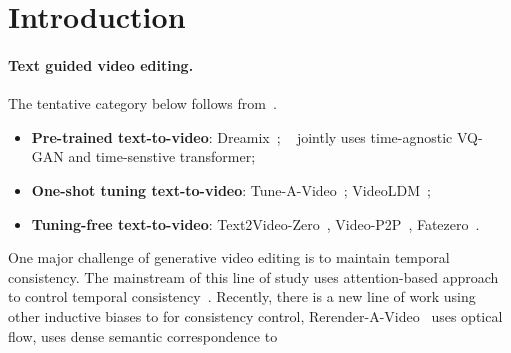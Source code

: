 \section{Introduction}
\paragraph{Text guided video editing.} The tentative category below follows from~\cite{wang2023gen}.
\begin{itemize}
    \item \textbf{Pre-trained text-to-video}: Dreamix~\citep{molad2023dreamix}; ~\cite{ge2022long} jointly uses time-agnostic VQ-GAN and time-senstive transformer; 
    \item \textbf{One-shot tuning text-to-video}: Tune-A-Video~\citep{wu2022tune}; VideoLDM~\citep{blattmann2023align};
    \item \textbf{Tuning-free text-to-video}: Text2Video-Zero~\citep{khachatryan2023text2video}, Video-P2P~\citep{liu2023video}, Fatezero~\citep{qi2023fatezero}.
\end{itemize}


One major challenge of generative video editing is to maintain temporal consistency. The mainstream of this line of study uses attention-based approach to control temporal consistency~\citep{wu2022tune}. Recently, there is a new line of work using other inductive biases to for consistency control, \eg Rerender-A-Video~\citep{yang2023rerender} uses optical flow, \cite{lee2023shape} uses dense semantic correspondence to 
